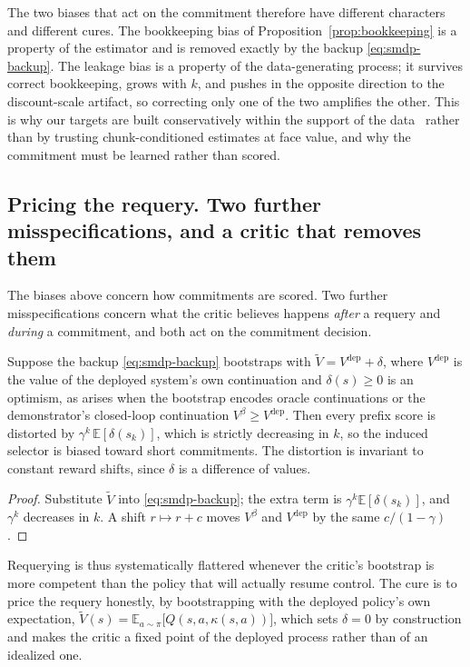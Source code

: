 The two biases that act on the commitment therefore have different characters and different
cures. The bookkeeping bias of Proposition~\ref{prop:bookkeeping} is a property of the estimator
and is removed exactly by the backup \eqref{eq:smdp-backup}. The leakage bias is a property of the
data-generating process; it survives correct bookkeeping, grows with $k$, and pushes in the
opposite direction to the discount-scale artifact, so correcting only one of the two amplifies the
other. This is why our targets are built conservatively within the support of the
data~\citep{iql, deas} rather than by trusting chunk-conditioned estimates at face value, and why
the commitment must be learned rather than scored.

\subsection{Pricing the requery. Two further misspecifications, and a critic that removes them}
\label{app:fair}

The biases above concern how commitments are scored. Two further misspecifications concern what
the critic believes happens \emph{after} a requery and \emph{during} a commitment, and both act on
the commitment decision.

\begin{proposition}
\label{prop:optimism}
Suppose the backup \eqref{eq:smdp-backup} bootstraps with $\widetilde V=V^{\mathrm{dep}}+\delta$,
where $V^{\mathrm{dep}}$ is the value of the deployed system's own continuation and
$\delta(s)\ge0$ is an optimism, as arises when the bootstrap encodes oracle continuations or the
demonstrator's closed-loop continuation $V^{\beta}\ge V^{\mathrm{dep}}$. Then every prefix score
is distorted by $\gamma^{k}\,\mathbb E[\delta(s_k)]$, which is strictly decreasing in $k$, so the
induced selector is biased toward short commitments. The distortion is invariant to constant
reward shifts, since $\delta$ is a difference of values.
\end{proposition}
\begin{proof}
Substitute $\widetilde V$ into \eqref{eq:smdp-backup}; the extra term is $\gamma^{k}\mathbb
E[\delta(s_k)]$, and $\gamma^{k}$ decreases in $k$. A shift $r\mapsto r+c$ moves $V^{\beta}$ and
$V^{\mathrm{dep}}$ by the same $c/(1-\gamma)$.
\end{proof}

Requerying is thus systematically flattered whenever the critic's bootstrap is more competent
than the policy that will actually resume control. The cure is to price the requery honestly, by
bootstrapping with the deployed policy's own expectation,
$\widetilde V(s)=\mathbb E_{a\sim\pi}\bigl[Q(s,a,\kappa(s,a))\bigr]$, which sets $\delta=0$ by
construction and makes the critic a fixed point of the deployed process rather than of an
idealized one.

